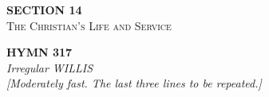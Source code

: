 \newpage
\thispagestyle{empty}
\vspace*{3.5cm}
\begin{center}
    {\LARGE \textbf{SECTION 14}}\\[0.8em]
    {\Large \textsc{The Christian's Life and Service}}
\end{center}
\vspace{3.5cm}

\newpage
\begin{center}
    {\Large \textbf{HYMN 317}}
    \\
    \textit{Irregular WILLIS}
    \\
    \textit{\small [Moderately fast. The last three lines to be repeated.]}
\end{center}
\vspace{1em}


